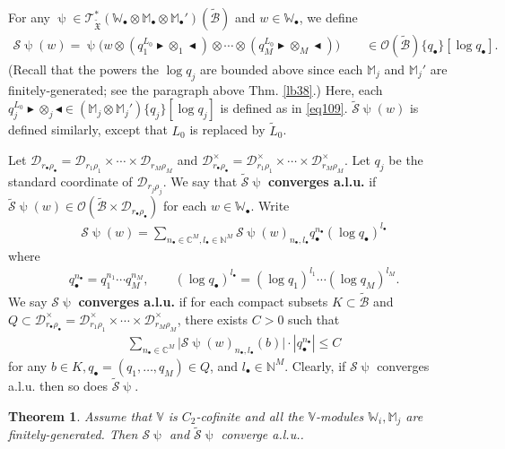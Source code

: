 \documentclass[12pt,a4paper,notitlepage]{article}
\theoremstyle{definition}
\theoremstyle{plain}
\newtheorem{thm}[df]{Theorem}
\newcommand{\fk}{\mathfrak}
\newcommand{\mc}{\mathcal}
\newcommand{\wtd}{\widetilde}
\newcommand{\scr}{\mathscr}
\newcommand{\blt}{\bullet}
\newcommand{\Vbb}{\mathbb V}
\newcommand{\Wbb}{\mathbb W}
\newcommand{\Mbb}{\mathbb M}
\newcommand{\Cbb}{\mathbb C}
\newcommand{\Nbb}{\mathbb N}
\newcommand{\btl}{\blacktriangleleft}
\newcommand{\btr}{\blacktriangleright}
\numberwithin{equation}{section}
\begin{document}
For any $\uppsi\in\scr T_{\wtd{\fk X}}^*(\Wbb_\blt\otimes\Mbb_\blt\otimes\Mbb_\blt')(\wtd{\mc B})$ and $w\in\Wbb_\blt$, \index{S@$\wtd{\mc S}\uppsi,\mc S\uppsi$} we define   
\begin{align}
\mc S\uppsi(w)=\uppsi\Big(w\otimes (q_1^{ L_0}\btr\otimes_1\btl)\otimes\cdots\otimes (q_M^{ L_0}\btr\otimes_M\btl)\Big)\qquad \in\scr O(\wtd{\mc B})\{q_\blt\}[\log q_\blt].
\end{align}
(Recall that the powers the $\log q_j$ are bounded above since each $\Mbb_j$ and $\Mbb_j'$ are finitely-generated; see the paragraph above Thm. \ref{lb38}.) Here, each $q_j^{L_0}\btr\otimes_j\btl\in(\Mbb_j\otimes\Mbb_j')\{q_j\}[\log q_j]$ is defined as in \eqref{eq109}. $\wtd{\mc S}\uppsi(w)$ is defined similarly, except that $L_0$ is replaced by $\wtd L_0$.


Let $\mc D_{r_\blt\rho_\blt}=\mc D_{r_1\rho_1}\times\cdots\times\mc D_{r_M\rho_M}$ and $\mc D_{r_\blt\rho_\blt}^\times=\mc D_{r_1\rho_1}^\times\times\cdots\times\mc D_{r_M\rho_M}^\times$. Let $q_j$ be the standard coordinate of $\mc D_{r_j\rho_j}$. We say that $\wtd{\mc S}\uppsi$ \textbf{converges a.l.u.} if $\wtd{\mc S}\uppsi(w)\in\scr O(\wtd{\mc B}\times\mc D_{r_\blt\rho_\blt})$ for each $w\in\Wbb_\blt$. Write
\begin{align*}
\mc S\uppsi(w)=\sum_{n_\blt\in\Cbb^M,l_\blt\in\Nbb^M}\mc S\uppsi(w)_{n_\blt,l_\blt}q_\blt^{n_\blt}(\log q_\blt)^{l_\blt}	
\end{align*}
where 
\begin{align*}
q_\blt^{n_\blt}=q_1^{n_1}\cdots q_M^{n_M},\qquad (\log q_\blt)^{l_\blt}=(\log q_1)^{l_1}\cdots(\log q_M)^{l_M}.	
\end{align*}
We say $\mc S\uppsi$ \textbf{converges a.l.u.} if for each compact subsets $K\subset\wtd{\mc B}$ and $Q\subset\mc D_{r_\blt\rho_\blt}^\times=\mc D_{r_1\rho_1}^\times\times\cdots\times\mc D_{r_M\rho_M}^\times$, there exists $C>0$ such that
\begin{align*}
\sum_{n_\blt\in\Cbb^M}\big|\mc S\uppsi(w)_{n_\blt,l_\blt}(b)\big|\cdot |q_\blt^{n_\blt}|	\leq C
\end{align*}
for any $b\in K,q_\blt=(q_1,\dots,q_M)\in Q$, and $l_\blt\in\Nbb^M$.
Clearly, if $\mc S\uppsi$ converges a.l.u. then so does $\wtd{\mc S}\uppsi$.




\begin{thm}\label{lb55}
Assume that $\Vbb$ is $C_2$-cofinite and all the $\Vbb$-modules $\Wbb_i,\Mbb_j$ are finitely-generated. Then $\mc S\uppsi$ and $\wtd{\mc S}\uppsi$ converge a.l.u..
\end{thm}
\end{document}
